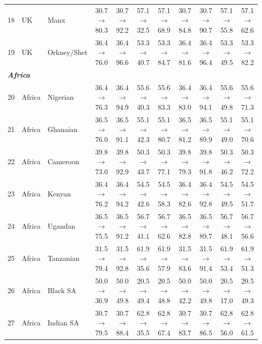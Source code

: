 \begin{table}[t]
{\begin{tabular}{rll c c c c c c c c}
18 & UK & Manx & 30.7$\rightarrow$80.3 & 30.7$\rightarrow$92.2 & 57.1$\rightarrow$32.5 & 57.1$\rightarrow$68.9 & 30.7$\rightarrow$84.8 & 30.7$\rightarrow$90.7 & 57.1$\rightarrow$55.8 & 57.1$\rightarrow$62.6 \\
19 & UK & Orkney/Shet & 36.4$\rightarrow$76.0 & 36.4$\rightarrow$96.6 & 53.3$\rightarrow$40.7 & 53.3$\rightarrow$84.7 & 36.4$\rightarrow$81.6 & 36.4$\rightarrow$96.4 & 53.3$\rightarrow$49.5 & 53.3$\rightarrow$82.2 \\
\midrule
\multicolumn{11}{l}{\textit{\textbf{Africa}}} \\
20 & Africa & Nigerian & 36.4$\rightarrow$76.3 & 36.4$\rightarrow$94.9 & 55.6$\rightarrow$40.3 & 55.6$\rightarrow$83.3 & 36.4$\rightarrow$83.0 & 36.4$\rightarrow$94.1 & 55.6$\rightarrow$49.8 & 55.6$\rightarrow$71.3 \\
21 & Africa & Ghanaian & 36.5$\rightarrow$76.0 & 36.5$\rightarrow$91.1 & 55.1$\rightarrow$42.3 & 55.1$\rightarrow$80.7 & 36.5$\rightarrow$81.2 & 36.5$\rightarrow$89.9 & 55.1$\rightarrow$49.0 & 55.1$\rightarrow$70.6 \\
22 & Africa & Cameroon & 39.8$\rightarrow$73.0 & 39.8$\rightarrow$92.9 & 50.3$\rightarrow$43.7 & 50.3$\rightarrow$77.1 & 39.8$\rightarrow$79.3 & 39.8$\rightarrow$91.8 & 50.3$\rightarrow$46.2 & 50.3$\rightarrow$72.2 \\
23 & Africa & Kenyan & 36.4$\rightarrow$76.2 & 36.4$\rightarrow$94.2 & 54.5$\rightarrow$42.6 & 54.5$\rightarrow$58.3 & 36.4$\rightarrow$82.6 & 36.4$\rightarrow$92.8 & 54.5$\rightarrow$49.5 & 54.5$\rightarrow$51.7 \\
24 & Africa & Ugandan & 36.5$\rightarrow$75.5 & 36.5$\rightarrow$91.2 & 56.7$\rightarrow$41.1 & 56.7$\rightarrow$62.6 & 36.5$\rightarrow$82.8 & 36.5$\rightarrow$89.7 & 56.7$\rightarrow$48.1 & 56.7$\rightarrow$56.6 \\
25 & Africa & Tanzanian & 31.5$\rightarrow$79.4 & 31.5$\rightarrow$92.8 & 61.9$\rightarrow$35.6 & 61.9$\rightarrow$57.9 & 31.5$\rightarrow$83.6 & 31.5$\rightarrow$91.4 & 61.9$\rightarrow$53.4 & 61.9$\rightarrow$51.3 \\
26 & Africa & Black SA & 50.0$\rightarrow$36.9 & 50.0$\rightarrow$49.8 & 20.5$\rightarrow$49.4 & 20.5$\rightarrow$48.8 & 50.0$\rightarrow$42.2 & 50.0$\rightarrow$49.8 & 20.5$\rightarrow$17.0 & 20.5$\rightarrow$49.3 \\
27 & Africa & Indian SA & 30.7$\rightarrow$79.5 & 30.7$\rightarrow$88.4 & 62.8$\rightarrow$35.5 & 62.8$\rightarrow$67.4 & 30.7$\rightarrow$83.7 & 30.7$\rightarrow$86.5 & 62.8$\rightarrow$56.0 & 62.8$\rightarrow$61.5 \\

\end{tabular}}
\end{table}
